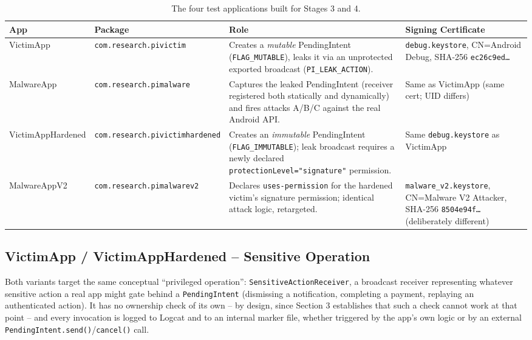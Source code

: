 \documentclass[11pt]{article}
\begin{document}
\begin{table}[h]
\centering
\begin{tabular}{@{}p{2.6cm}p{3.1cm}p{3.6cm}p{4.3cm}@{}}
\toprule
\textbf{App} & \textbf{Package} & \textbf{Role} & \textbf{Signing Certificate} \\
\midrule
VictimApp & \texttt{com.research.pivictim} & Creates a \emph{mutable} PendingIntent
(\texttt{FLAG\_MUTABLE}), leaks it via an unprotected exported broadcast
(\texttt{PI\_LEAK\_ACTION}). & \texttt{debug.keystore}, CN=Android Debug,
SHA-256 \texttt{ec26c9ed\ldots} \\
MalwareApp & \texttt{com.research.pimalware} & Captures the leaked PendingIntent
(receiver registered both statically and dynamically) and fires attacks A/B/C against
the real Android API. & Same as VictimApp (same cert; UID differs) \\
VictimAppHardened & \texttt{com.research.pivictimhardened} & Creates an
\emph{immutable} PendingIntent (\texttt{FLAG\_IMMUTABLE}); leak broadcast requires a
newly declared \texttt{protectionLevel="signature"} permission. & Same
\texttt{debug.keystore} as VictimApp \\
MalwareAppV2 & \texttt{com.research.pimalwarev2} & Declares
\texttt{uses-permission} for the hardened victim's signature permission; identical
attack logic, retargeted. & \texttt{malware\_v2.keystore}, CN=Malware V2 Attacker,
SHA-256 \texttt{8504e94f\ldots} (deliberately different) \\
\bottomrule
\end{tabular}
\caption{The four test applications built for Stages 3 and 4.}
\end{table}

\subsection*{VictimApp / VictimAppHardened -- Sensitive Operation}
Both variants target the same conceptual ``privileged operation'':
\texttt{SensitiveActionReceiver}, a broadcast receiver representing whatever sensitive
action a real app might gate behind a \texttt{PendingIntent} (dismissing a
notification, completing a payment, replaying an authenticated action). It has no
ownership check of its own -- by design, since Section 3 establishes that such a check
cannot work at that point -- and every invocation is logged to Logcat and to an
internal marker file, whether triggered by the app's own logic or by an external
\texttt{PendingIntent.send()}/\texttt{cancel()} call.
\end{document}
